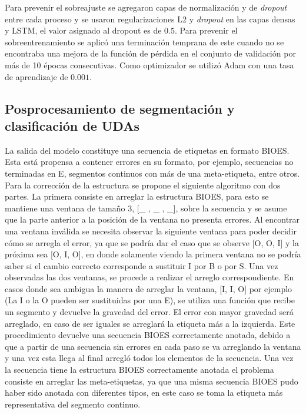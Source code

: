\documentclass[a4paper,11pt,twocolumn,twoside]{article}
\begin{document}
Para prevenir el sobreajuste se agregaron capas de normalización y de \textit{dropout} entre cada proceso y se usaron regularizaciones
L2 y \textit{dropout} en las capas densas y LSTM, el valor asignado al dropout es de $0.5$. 
Para prevenir el sobreentrenamiento se aplicó una 
terminación temprana de este cuando no se encontraba una mejora de la función de pérdida en el conjunto de validación
por más de 10 épocas consecutivas. Como optimizador se utilizó Adam con una tasa de aprendizaje de $0.001$.

\subsection{Posprocesamiento de segmentación y clasificación de UDAs}

La salida del modelo constituye una secuencia de etiquetas en formato BIOES. Esta está propensa
a contener errores en su formato, por ejemplo, secuencias no terminadas en E, segmentos continuos con más de una 
meta-etiqueta, entre otros.
Para la corrección de la estructura se propone el siguiente algoritmo con dos partes. La primera
consiste en arreglar la estructura BIOES, para esto se mantiene una ventana de tamaño
3, [\_ , \_ , \_], sobre la secuencia y se asume que la parte anterior a la posición de la ventana no presenta errores. Al encontrar una
ventana inválida se necesita observar la siguiente ventana para poder decidir cómo se arregla el error, ya que se
podría dar el caso que se observe [O, O, I] y la próxima sea [O, I, O], en donde solamente viendo la primera ventana no se podría saber si el cambio 
correcto corresponde a sustituir I por B o por S. Una vez observadas las dos ventanas, se procede a realizar el 
arreglo correspondiente. En casos donde sea ambigua la manera de arreglar la ventana, [I, I, O] por ejemplo
(La I o la O pueden ser 
sustituidas por una E), se utiliza una función que recibe un segmento y devuelve la gravedad del error.
El error con mayor gravedad será arreglado, en caso de ser iguales se arreglará la etiqueta más a la izquierda.
Este procedimiento devuelve una secuencia BIOES correctamente anotada, debido a que a partir de una secuencia sin 
errores en cada paso se va arreglando la ventana y una vez esta llega al final arregló todos los elementos de la secuencia.
Una vez la secuencia tiene la estructura BIOES correctamente anotada el problema
consiste en arreglar las meta-etiquetas, ya que una misma secuencia BIOES pudo haber sido anotada con diferentes
tipos, en este caso se toma la etiqueta más representativa del segmento continuo.
\end{document}
